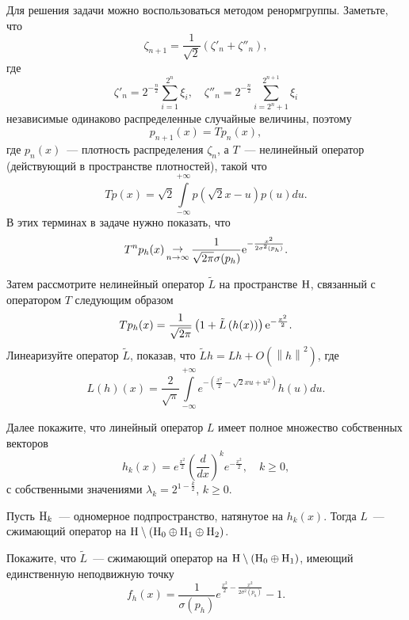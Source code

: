\begin{remark} 
Для решения задачи можно воспользоваться методом ренормгруппы. Заметьте, что
$$\zeta _{n+1} =\frac{1}{\sqrt 2 }\left( {\zeta '_n 
+\zeta ''_n } \right),$$
где 
$$
\zeta '_n 
=2^{-\frac{n}{2}}\sum\limits_{i=1}^{2^n} {\xi _i },\quad 
\zeta ''_n 
=2^{-\frac{n}{2}}\sum\limits_{i=2^n+1}^{2^{n+1}} {\xi _i }
$$
независимые 
одинаково распределенные случайные величины, поэтому 
$$
p_{n+1} (x)=Tp_n (x),
$$ 
где $p_n (x)$~--- плотность распределения $\zeta _n $, а $T$~--- нелинейный 
оператор (действующий в пространстве плотностей), такой что 
$$
Tp(x)=\sqrt 2 
\int\limits_{-\infty }^{+\infty } {p(\sqrt 2 x-u)p(u)du}.
$$ 
В этих терминах 
в задаче нужно показать, что 
\[
T^n p_h (x)\mathop \to \limits_{n\to \infty } 
\frac{1}{\sqrt {2\pi } \sigma (p_h )}{\rm e}^{-\frac{x^2}{2\sigma ^2(p_h )}}.
\] 

Затем рассмотрите нелинейный оператор $\tilde{L}$ на пространстве ${\rm H}$, связанный с 
оператором $T$ следующим образом
$$
T p_h (x)=\frac{1}{\sqrt {2\pi } }\left( 
{1+\tilde{L}\left( {h(x)} \right)} \right){\rm e}^{-\frac{x^2}{2}}.
$$ 
Линеаризуйте 
оператор $\tilde {L}$, показав, что $\tilde {L}h=Lh+O\left( {\left\| h 
\right\|^2} \right)$, где 
\[L(h)(x)=\frac{2}{\sqrt \pi }\int\limits_{-\infty 
}^{+\infty } {e^{-\left( {\frac{x^2}{2}-\sqrt 2 xu+u^2} \right)}h(u)du} .
\]

Далее покажите, что линейный оператор $L$ имеет полное множество собственных 
векторов 
$$h_k (x)=e^{\frac{x^2}{2}}\left( {\frac{d}{dx}} 
\right)^ke^{-\frac{x^2}{2}},\quad k\ge 0,
$$
с собственными значениями $\lambda 
_k =2^{1-\frac{k}{2}}$, $k\ge 0$. 

Пусть ${\rm H}_k $~--- одномерное 
подпространство, натянутое на $h_k (x)$. Тогда $L$~--- сжимающий оператор на 
${\rm H} \setminus \left( {{\rm H}_0 \oplus {\rm H}_1 \oplus {\rm H}_2 } \right)$.


Покажите, что $\tilde {L}$~--- сжимающий оператор на ${\rm H} \setminus \left( {{\rm 
H}_0 \oplus {\rm H}_1 } \right)$, имеющий единственную неподвижную точку 
\[f_h (x)=\frac{1}{\sigma (p_h )}e^{\frac{x^2}{2}-\frac{x^2}{2\sigma ^2(p_h 
)}}-1.
\]
\end{remark}



